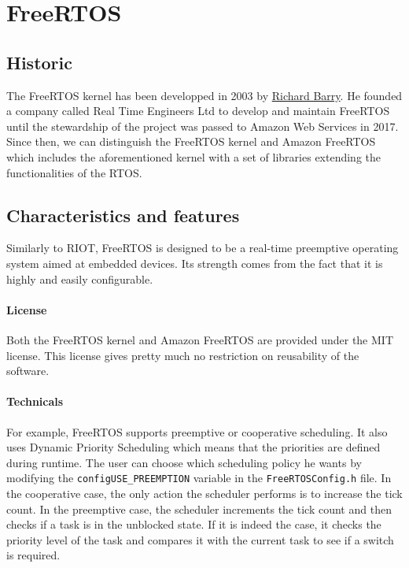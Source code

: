 \section{FreeRTOS}

\subsection{Historic}
The FreeRTOS kernel has been developped in 2003 by \href{https://www.linkedin.com/in/richard-barry-4562262/}{Richard Barry}. %
He founded a company called Real Time Engineers Ltd to develop and maintain FreeRTOS until the stewardship of the project was passed to Amazon Web Services in 2017.
Since then, we can distinguish the FreeRTOS kernel and Amazon FreeRTOS which includes the aforementioned kernel 
    with a set of libraries extending the functionalities of the RTOS.

\subsection{Characteristics and features}
Similarly to RIOT, FreeRTOS is designed to be a real-time preemptive operating system aimed at embedded devices.
Its strength comes from the fact that it is highly and easily configurable.\\

\paragraph{License} Both the FreeRTOS kernel and Amazon FreeRTOS are provided under the MIT license\cite{FreeRTOSlicense}.
This license gives pretty much no restriction on reusability of the software.

\paragraph{Technicals} For example, FreeRTOS supports preemptive or cooperative scheduling\cite{goyette}. 
It also uses Dynamic Priority Scheduling which means that the priorities are defined during runtime.
The user can choose which scheduling policy he wants by modifying the \texttt{configUSE\_PREEMPTION} variable in the \texttt{FreeRTOSConfig.h} file.
In the cooperative case, the only action the scheduler performs is to increase the tick count.
In the preemptive case, the scheduler increments the tick count and then checks if a task is in the unblocked state.
If it is indeed the case, it checks the priority level of the task and compares it with the current task to see if a switch is required.\\

